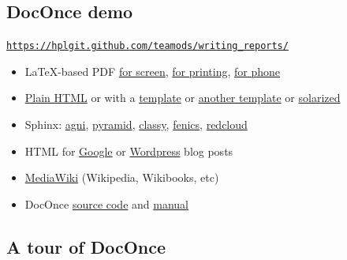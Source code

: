 \documentclass[%
oneside,                 %
final,                   %
10pt]{article}
\newcounter{doconce:movie:counter}
\begin{document}
\subsection{DocOnce demo}
\href{{https://hplgit.github.com/teamods/writing_reports/}}{\nolinkurl{https://hplgit.github.com/teamods/writing_reports/}}
\begin{itemize}
 \item LaTeX-based PDF \href{{https://hplgit.github.com/teamods/writing_reports/_static/report.pdf}}{for screen}, \href{{https://hplgit.github.com/teamods/writing_reports/_static/report_4printing.pdf}}{for printing}, \href{{https://hplgit.github.com/teamods/writing_reports/_static/report_4phone.pdf}}{for phone}
 \item \href{{https://hplgit.github.com/teamods/writing_reports/_static/report_do.html}}{Plain HTML} or with a \href{{https://hplgit.github.com/teamods/writing_reports/_static/report_vagrant.html}}{template} or \href{{https://hplgit.github.com/teamods/writing_reports/_static/report_github_minimal.html}}{another template} or \href{{https://hplgit.github.com/teamods/writing_reports/_static/report_solarized.html}}{solarized}
 \item Sphinx: \href{{https://hplgit.github.com/teamods/writing_reports/_static/sphinx-agni/index.html}}{agni}, \href{{https://hplgit.github.com/teamods/writing_reports/_static/sphinx-pyramid/report.html}}{pyramid}, \href{{https://hplgit.github.com/teamods/writing_reports/_static/sphinx-classy/report.html}}{classy}, \href{{https://hplgit.github.com/teamods/writing_reports/_static/sphinx-fenics_minimal/report.html}}{fenics}, \href{{https://hplgit.github.com/teamods/writing_reports/_static/sphinx-fenics_minimal/report.html}}{redcloud}
 \item HTML for \href{{https://doconce-report-demo.blogspot.no/}}{Google} or \href{{https://doconcereportdemo.wordpress.com/}}{Wordpress} blog posts
 \item \href{{https://doconcedemo.shoutwiki.com/wiki/DocOnce_demo_page}}{MediaWiki} (Wikipedia, Wikibooks, etc)
 \item DocOnce \href{{https://hplgit.github.com/teamods/writing_reports/_static/report.do.txt.html}}{source code} and \href{{https://hplgit.github.io/doconce/doc/src/pub/manual/html/manual.html}}{manual}
\end{itemize}
\noindent
\subsection{A tour of DocOnce}
\end{document}
